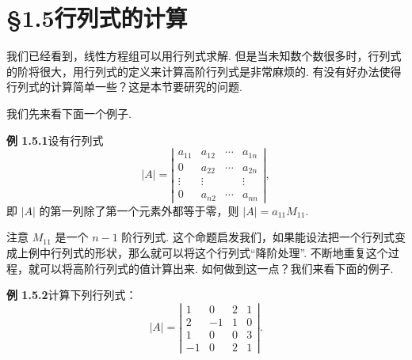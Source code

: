 \documentclass[UTF8,12pt,a4paper,fontset=fandol]{ctexart}
\begin{document}
\section*{§1.5\quad 行列式的计算}

我们已经看到，线性方程组可以用行列式求解. 但是当未知数个数很多时，行列式的阶将很大，用行列式的定义来计算高阶行列式是非常麻烦的. 有没有好办法使得行列式的计算简单一些？这是本节要研究的问题.

我们先来看下面一个例子.

\noindent\textbf{例 1.5.1}\quad 设有行列式
\[
|A|=
\left|\begin{array}{ccccc}
a_{11} & a_{12} & \cdots & a_{1n}\\
0 & a_{22} & \cdots & a_{2n}\\
\vdots & \vdots & & \vdots\\
0 & a_{n2} & \cdots & a_{nn}
\end{array}\right|,
\]
即 $|A|$ 的第一列除了第一个元素外都等于零，则 $|A|=a_{11}M_{11}$.

注意 $M_{11}$ 是一个 $n-1$ 阶行列式. 这个命题启发我们，如果能设法把一个行列式变成上例中行列式的形状，那么就可以将这个行列式“降阶处理”. 不断地重复这个过程，就可以将高阶行列式的值计算出来. 如何做到这一点？我们来看下面的例子.

\noindent\textbf{例 1.5.2}\quad 计算下列行列式：
\[
|A|=
\left|\begin{array}{cccc}
1 & 0 & 2 & 1\\
2 & -1 & 1 & 0\\
1 & 0 & 0 & 3\\
-1 & 0 & 2 & 1
\end{array}\right|.
\]
\end{document}
